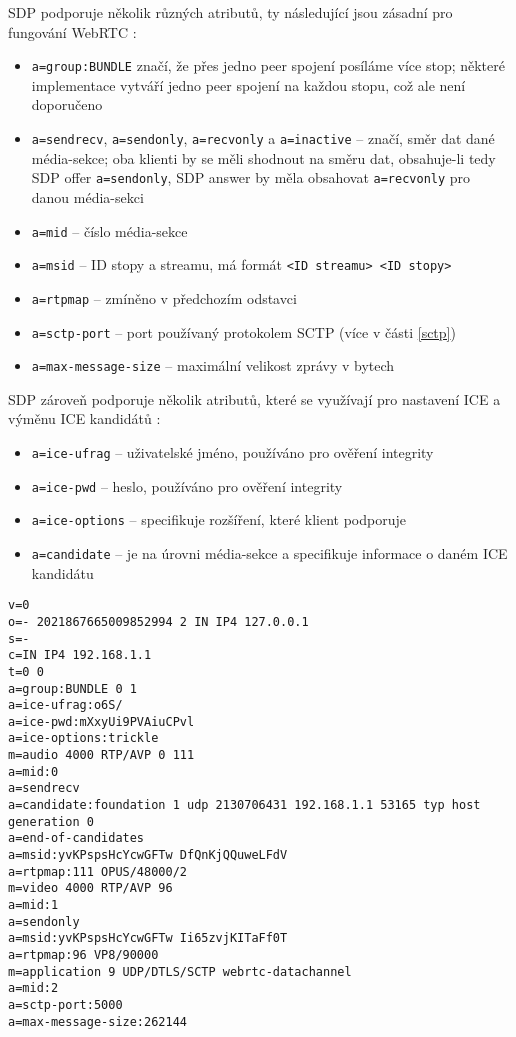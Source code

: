SDP podporuje několik různých atributů, ty následující jsou zásadní pro fungování
WebRTC \parencite{WebRTCForTheCurious,IETF-RFC8866,IETF-RFC5888,IETF-RFC8841}:
\begin{itemize}
    \item \texttt{a=group:BUNDLE} značí, že přes jedno peer spojení
          posíláme více stop; některé implementace vytváří jedno peer spojení na
          každou stopu, což ale není doporučeno
    \item \texttt{a=sendrecv}, \texttt{a=sendonly},
          \texttt{a=recvonly} a \texttt{a=inactive} --
          značí, směr dat dané média-sekce; oba klienti by se měli shodnout na
          směru dat, obsahuje-li tedy SDP offer \texttt{a=sendonly},
          SDP answer by měla obsahovat \texttt{a=recvonly} pro danou
          média-sekci
    \item \texttt{a=mid} -- číslo média-sekce
    \item \texttt{a=msid} -- ID stopy a streamu, má formát
          \texttt{<ID streamu> <ID stopy>}
    \item \texttt{a=rtpmap} -- zmíněno v předchozím odstavci
    \item \texttt{a=sctp-port} -- port používaný protokolem SCTP (více
          v části \ref{sctp})
    \item \texttt{a=max-message-size} -- maximální velikost zprávy v
          bytech
\end{itemize}

SDP zároveň podporuje několik atributů, které se využívají pro nastavení ICE a
výměnu ICE kandidátů \parencite{WebRTCForTheCurious,IETF-RFC8839}:
\begin{itemize}
    \item \texttt{a=ice-ufrag} -- uživatelské jméno, používáno pro
          ověření integrity
    \item \texttt{a=ice-pwd} -- heslo, používáno pro ověření integrity
    \item \texttt{a=ice-options} -- specifikuje rozšíření, které
          klient podporuje
    \item \texttt{a=candidate} -- je na úrovni média-sekce a
          specifikuje informace o daném ICE kandidátu
\end{itemize}

\begin{verbatim}
v=0
o=- 2021867665009852994 2 IN IP4 127.0.0.1
s=-
c=IN IP4 192.168.1.1
t=0 0
a=group:BUNDLE 0 1
a=ice-ufrag:o6S/
a=ice-pwd:mXxyUi9PVAiuCPvl
a=ice-options:trickle
m=audio 4000 RTP/AVP 0 111
a=mid:0
a=sendrecv
a=candidate:foundation 1 udp 2130706431 192.168.1.1 53165 typ host generation 0
a=end-of-candidates
a=msid:yvKPspsHcYcwGFTw DfQnKjQQuweLFdV
a=rtpmap:111 OPUS/48000/2
m=video 4000 RTP/AVP 96
a=mid:1
a=sendonly
a=msid:yvKPspsHcYcwGFTw Ii65zvjKITaFf0T
a=rtpmap:96 VP8/90000
m=application 9 UDP/DTLS/SCTP webrtc-datachannel
a=mid:2
a=sctp-port:5000
a=max-message-size:262144
\end{verbatim}

